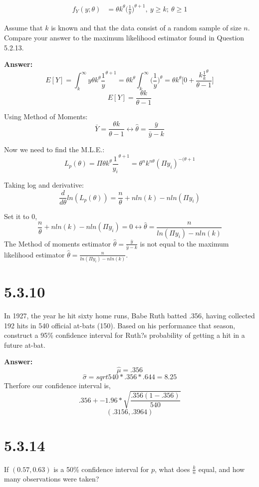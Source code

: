\documentclass[11pt]{article}
\begin{document}
\begin{align*}
    f_Y(y; \theta) &= \theta k^{\theta} \Bigg(\frac{1}{y}\Bigg)^{\theta + 1}, \ y \geq k;\ \theta \geq 1
\end{align*}

Assume that $k$ is known and that the data consist of a random sample of size $n$. Compare your answer to the maximum likelihood estimator found in Question 5.2.13.

\textbf{Answer:}
$$E[Y]=\int_{k}^{\infty}y\theta k^{\theta}\frac{1}{y}^{\theta +1}=\theta k^{\theta}\int_{k}^{\infty}\Big(\frac{1}{y}\Big)^{\theta}=\theta k^{\theta}\Big[0 +\frac{k\frac{1}{k}^\theta}{\theta -1} \Big]$$
$$E[Y] = \frac{\theta k }{\theta - 1}$$

Using Method of Moments:
$$\bar{Y}= \frac{\theta k }{\theta - 1} \leftrightarrow \hat{\theta} = \frac{\bar{y}}{\bar{y}-k}$$

Now we need to find the M.L.E.:
$$L_p(\theta)=\Pi \theta k^{\theta} \frac{1}{y_i}^{\theta+1}=\theta^n k^{n\theta}(\Pi y_i)^{-(\theta+1}$$

Taking log and derivative:
$$\frac{d}{d\theta}ln(L_p(\theta))=\frac{n}{\theta}+nln(k) - nln(\Pi y_i)$$

Set it to 0,
$$\frac{n}{\theta}+nln(k) - nln(\Pi y_i)= 0 \leftrightarrow \hat{\theta}=\frac{n}{ln(\Pi y_i) - nln(k)}$$
\newline
\newline
\newline
The Method of moments estimator $\hat{\theta} = \frac{\bar{y}}{\bar{y}-k}$ is not equal to the maximum likelihood estimator $\hat{\theta}=\frac{n}{ln(\Pi y_i) - nln(k)}$.

\section{5.3.10}
In 1927, the year he hit sixty home runs, Babe Ruth batted .356, having collected 192 hits in 540 official at-bats (150). Based on his performance that season, construct a 95\% confidence interval for Ruth?s probability of getting a hit in a future at-bat.

\textbf{Answer:}
$$ \hat{\mu} = .356$$
$$\hat{\sigma} = sqrt{540 * .356 * .644}=8.25$$
Therfore our confidence interval is,
$$.356 +-1.96* \sqrt{\frac{.356(1-.356)}{540}}$$
$$(.3156,.3964)$$

\section{5.3.14}
If $(0.57,0.63)$ is a 50\% confidence interval for $p$, what does $\frac{k}{n}$ equal, and how many observations were taken?
\end{document}
